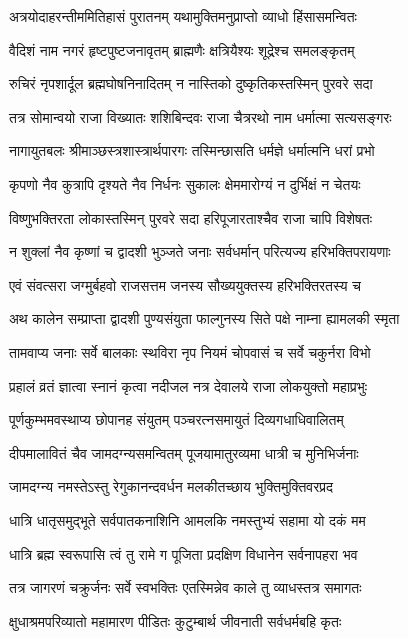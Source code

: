 \twolineshloka
{अत्रयोदाहरन्तीममितिहासं पुरातनम्}
{यथामुक्तिमनुप्राप्तो व्याधो हिंसासमन्वितः} %

\twolineshloka
{वैदिशं नाम नगरं हृष्टपुष्टजनावृतम्}
{ब्राह्मणैः क्षत्रियैश्यः शूद्रेश्च समलङ्कृतम्} %

\twolineshloka
{रुचिरं नृपशार्दूल ब्रह्मघोषनिनादितम्}
{न नास्तिको दुष्कृतिकस्तस्मिन् पुरवरे सदा} %

\twolineshloka
{तत्र सोमान्वयो राजा विख्यातः शशिबिन्दवः}
{राजा चैत्ररथो नाम धर्मात्मा सत्यसङ्गरः} %

\twolineshloka
{नागायुतबलः श्रीमाञ्छस्त्रशास्त्रार्थपारगः}
{तस्मिन्छासति धर्मज्ञे धर्मात्मनि धरां प्रभो} %

\twolineshloka
{कृपणो नैव कुत्रापि दृश्यते नैव निर्धनः}
{सुकालः क्षेममारोग्यं न दुर्भिक्षं न चेतयः} %

\twolineshloka
{विष्णुभक्तिरता लोकास्तस्मिन् पुरवरे सदा}
{हरिपूजारताश्चैव राजा चापि विशेषतः} %

\twolineshloka
{न शुक्लां नैव कृष्णां च द्वादशी भुञ्जते जनाः}
{सर्वधर्मान् परित्यज्य हरिभक्तिपरायणाः} %

\twolineshloka
{एवं संवत्सरा जग्मुर्बहवो राजसत्तम}
{जनस्य सौख्ययुक्तस्य हरिभक्तिरतस्य च} %

\twolineshloka
{अथ कालेन सम्प्राप्ता द्वादशी पुण्यसंयुता}
{फाल्गुनस्य सिते पक्षे नाम्ना ह्यामलकी स्मृता} %

\twolineshloka
{तामवाप्य जनाः सर्वे बालकाः स्थविरा नृप}
{नियमं चोपवासं च सर्वे चकुर्नरा विभो} %

\twolineshloka
{प्रहालं व्रतं ज्ञात्वा स्नानं कृत्वा नदीजल}
{नत्र देवालये राजा लोकयुक्तो महाप्रभुः} %

\twolineshloka
{पूर्णकुम्भमवस्थाप्य छोपानह संयुतम्}
{पञ्चरत्नसमायुतं दिव्यगधाधिवालितम्} %

\twolineshloka
{दीपमालावितं चैव जामदग्न्यसमन्वितम्}
{पूजयामातुरव्यमा धात्री च मुनिभिर्जनाः} %

\twolineshloka
{जामदग्न्य नमस्तेऽस्तु रेगुकानन्दवर्धन}
{मलकीतच्छाय भुक्तिमुक्तिवरप्रद} %

\twolineshloka
{धात्रि धातृसमुद्भूते सर्वपातकनाशिनि}
{आमलकि नमस्तुभ्यं सहामा यो दकं मम} %

\twolineshloka
{धात्रि ब्रह्म स्वरूपासि त्वं तु रामे ग पूजिता}
{प्रदक्षिण विधानेन सर्वनापहरा भव} %

\twolineshloka
{तत्र जागरणं चक्रुर्जनः सर्वे स्वभक्तिः}
{एतस्मिन्नेव काले तु व्याधस्तत्र समागतः} %

\twolineshloka
{क्षुधाश्रमपरिव्यातो महामारण पीडितः}
{कुटुम्बार्थ जीवनाती सर्वधर्मबहि कृतः} %

